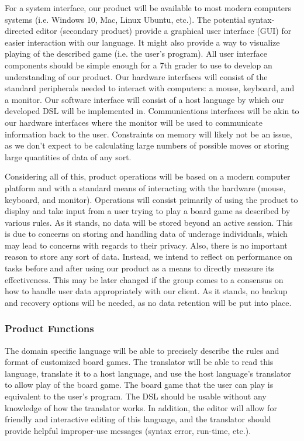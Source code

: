 \documentclass[10pt,letter,draftclsnofoot,onecolumn]{IEEEtran}
\begin{document}
\begin{singlespace}
        
        For a system interface, our product will be available to most modern computers systems (i.e. Windows 10, Mac, Linux Ubuntu, etc.). The potential syntax-directed editor (secondary product) provide a graphical user interface (GUI) for easier interaction with our language. It might also provide a way to visualize playing of the described game (i.e. the user's program). All user interface components should be simple enough for a 7th grader to use to develop an understanding of our product. Our hardware interfaces will consist of the standard peripherals needed to interact with computers: a mouse, keyboard, and a monitor. Our software interface will consist of a host language by which our developed DSL will be implemented in. Communications interfaces will be akin to our hardware interfaces where the monitor will be used to communicate information back to the user. Constraints on memory will likely not be an issue, as we don't expect to be calculating large numbers of possible moves or storing large quantities of data of any sort. 
        
        
        Considering all of this, product operations will be based on a modern computer platform and with a standard means of interacting with the hardware (mouse, keyboard, and monitor). Operations will consist primarily of using the product to display and take input from a user trying to play a board game as described by various rules. As it stands, no data will be stored beyond an active session. This is due to concerns on storing and handling data of underage individuals, which may lead to concerns with regards to their privacy. Also, there is no important reason to store any sort of data. Instead, we intend to reflect on performance on tasks before and after using our product as a means to directly measure its effectiveness. This may be later changed if the group comes to a consensus on how to handle user data appropriately with our client. As it stands, no backup and recovery options will be needed, as no data retention will be put into place.
        
    \subsubsection{Product Functions}
        The domain specific language will be able to precisely describe the rules and format of customized board games. The translator will be able to read this language, translate it to a host language, and use the host language's translator to allow play of the board game. The board game that the user can play is equivalent to the user's program. The DSL should be usable without any knowledge of how the translator works. In addition, the editor will allow for friendly and interactive editing of this language, and the translator should provide helpful improper-use messages (syntax error, run-time, etc.). 

\end{singlespace}
\end{document}
